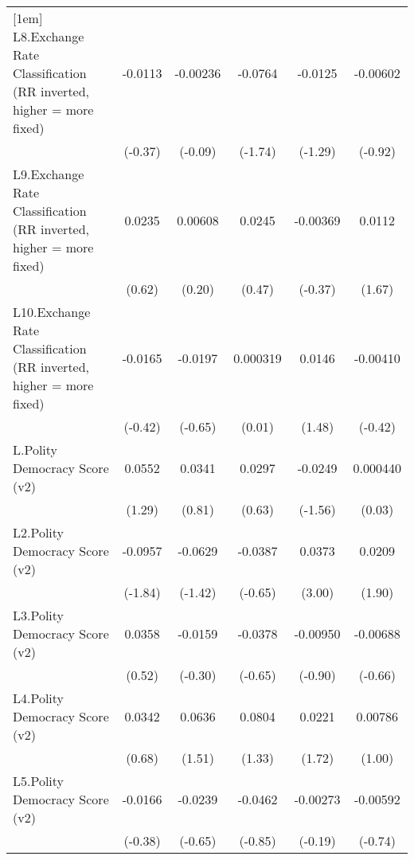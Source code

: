 {\begin{longtable}{l*{5}{c}}
[1em]
L8.Exchange Rate Classification (RR inverted, higher = more fixed)&  -0.0113         & -0.00236         &  -0.0764         &  -0.0125         & -0.00602         \\
                &  (-0.37)         &  (-0.09)         &  (-1.74)         &  (-1.29)         &  (-0.92)         \\
[1em]
L9.Exchange Rate Classification (RR inverted, higher = more fixed)&   0.0235         &  0.00608         &   0.0245         & -0.00369         &   0.0112         \\
                &   (0.62)         &   (0.20)         &   (0.47)         &  (-0.37)         &   (1.67)         \\
[1em]
L10.Exchange Rate Classification (RR inverted, higher = more fixed)&  -0.0165         &  -0.0197         & 0.000319         &   0.0146         & -0.00410         \\
                &  (-0.42)         &  (-0.65)         &   (0.01)         &   (1.48)         &  (-0.42)         \\
[1em]
L.Polity Democracy Score (v2)&   0.0552         &   0.0341         &   0.0297         &  -0.0249         & 0.000440         \\
                &   (1.29)         &   (0.81)         &   (0.63)         &  (-1.56)         &   (0.03)         \\
[1em]
L2.Polity Democracy Score (v2)&  -0.0957         &  -0.0629         &  -0.0387         &   0.0373\sym{**} &   0.0209         \\
                &  (-1.84)         &  (-1.42)         &  (-0.65)         &   (3.00)         &   (1.90)         \\
[1em]
L3.Polity Democracy Score (v2)&   0.0358         &  -0.0159         &  -0.0378         & -0.00950         & -0.00688         \\
                &   (0.52)         &  (-0.30)         &  (-0.65)         &  (-0.90)         &  (-0.66)         \\
[1em]
L4.Polity Democracy Score (v2)&   0.0342         &   0.0636         &   0.0804         &   0.0221         &  0.00786         \\
                &   (0.68)         &   (1.51)         &   (1.33)         &   (1.72)         &   (1.00)         \\
[1em]
L5.Polity Democracy Score (v2)&  -0.0166         &  -0.0239         &  -0.0462         & -0.00273         & -0.00592         \\
                &  (-0.38)         &  (-0.65)         &  (-0.85)         &  (-0.19)         &  (-0.74)         \\

\end{longtable}}
